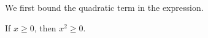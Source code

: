 We first bound the quadratic term in the expression.

\begin{MSresult}
If \(x\geq 0\), then \(x^2\geq 0\).
\end{MSresult}
